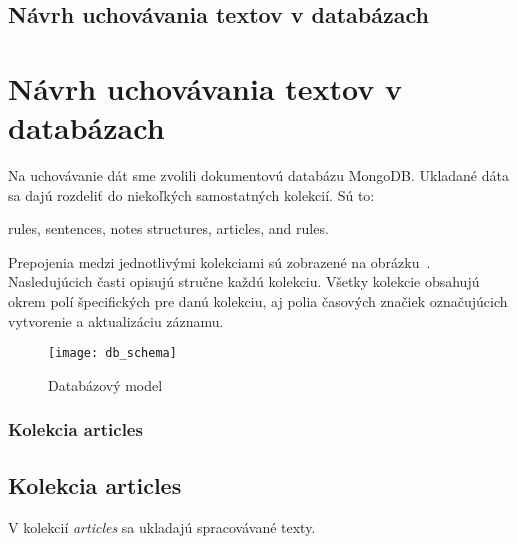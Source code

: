 %
%
{
	\subsection{Návrh uchovávania textov v databázach}
}
{
	\section{Návrh uchovávania textov v databázach}
}
\label{subsection:our_design_persisting_data}
Na uchovávanie dát sme zvolili dokumentovú databázu MongoDB. Ukladané dáta sa dajú rozdeliť do niekoľkých samostatných kolekcií. Sú to:

\begin{my_itemize}
	\myitem rules,
	\myitem sentences,
	\myitem notes
	\myitem structures,
	\myitem articles,
	\myitem and rules.
\end{my_itemize}
	
Prepojenia medzi jednotlivými kolekciami sú zobrazené na obrázku~. Nasledujúcich časti opisujú stručne každú kolekciu. Všetky kolekcie obsahujú okrem polí špecifických pre danú kolekciu, aj polia časových značiek označujúcich vytvorenie a aktualizáciu záznamu.

\begin{figure}[H]
	\begin{center}\texttt{[image: db\_schema]}\end{center}
	\caption[Databázový model]{Databázový model}\label{fig:db_schema}
\end{figure}

%
%
{
	\subsubsection{Kolekcia articles}
}
{
	\subsection{Kolekcia articles}
}
\label{subsubsection:collection_articles}
V kolekcií \textit{articles} sa ukladajú spracovávané texty. 

